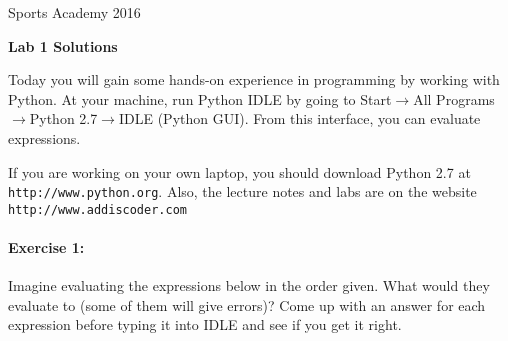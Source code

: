 \documentclass[11pt]{article}
\newlength{\toppush}
\newcommand{\htitle}[2]{\noindent\vspace*{-\toppush}\newline\parbox{6.5in}
 {\large Sports Academy \hfill #1\newline
\hspace*{\fill}{\bf Algorithms and Programming for High Schoolers} \hspace*{\fill} \newline
\mbox{}\hrulefill\mbox{}}\vspace*{1ex}\mbox{}\newline
\begin{center}{\Large\bf #2}\end{center}}
\begin{document}
\htitle{2016}{Lab 1 Solutions}

Today you will gain some hands-on experience in programming by
working with Python.  At your machine, run Python IDLE by going to
Start$\rightarrow$All Programs$\rightarrow$Python 2.7$\rightarrow$IDLE
(Python GUI). From this interface, you can evaluate expressions.

If you are working on your own laptop, you should download Python 2.7
at \texttt{http://www.python.org}.  Also, the lecture notes and labs
are on the website \texttt{http://www.addiscoder.com}

\paragraph{Exercise 1:}
Imagine evaluating the expressions below in the order given.
What would they evaluate to (some of them will give
errors)? Come up with an answer for
each expression before typing it into IDLE and see if you get it
right.
\end{document}
